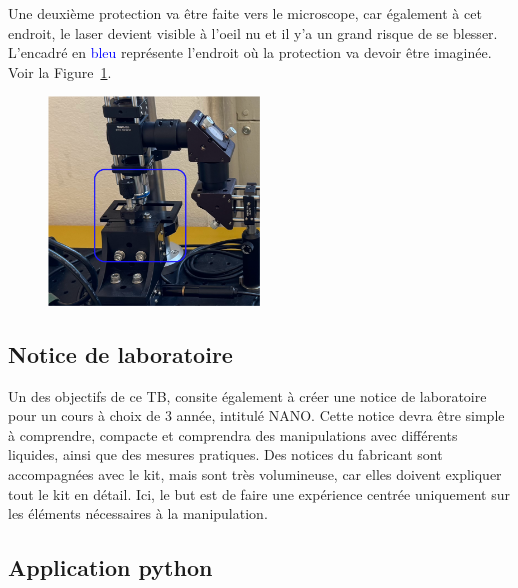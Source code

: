 \begin{minipage}{\textwidth}
    Une deuxième protection va être faite vers le microscope, car également à cet endroit, le laser devient visible à l'oeil nu et il y'a un grand risque de se blesser. L'encadré en \textcolor{blue}{bleu} représente l'endroit où la protection va devoir être imaginée. Voir la Figure~\ref{protection_laser_fin}.
    \vspace{1em}
    \begin{figure}[H]
        \begin{center}
            \includegraphics[width=0.5\textwidth]{assets/figures/Introduction/protection_fin_laser.png}
        \end{center}
        \label{protection_laser_fin}
    \end{figure}
\end{minipage}
\subsection{Notice de laboratoire}

Un des objectifs de ce TB, consite également à créer une notice de laboratoire pour un cours à choix de 3\ieme{} année, intitulé NANO. Cette notice devra être simple à comprendre, compacte et comprendra des manipulations avec différents liquides, ainsi que des mesures pratiques. Des notices du fabricant sont accompagnées avec le kit, mais sont très volumineuse, car elles doivent expliquer tout le kit en détail. Ici, le but est de faire une expérience centrée uniquement sur les éléments nécessaires à la manipulation.

\subsection{Application python}

